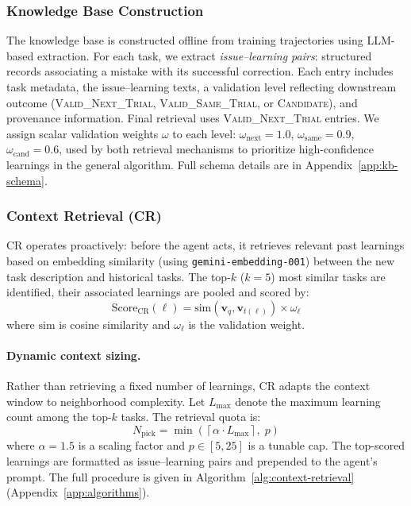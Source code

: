 \subsubsection{Knowledge Base Construction}
\label{sec:kb-construction}

The knowledge base is constructed offline from training trajectories using LLM-based extraction. For each task, we extract \emph{issue--learning pairs}: structured records associating a mistake with its successful correction. Each entry includes task metadata, the issue--learning texts, a validation level reflecting downstream outcome (\textsc{Valid\_Next\_Trial}, \textsc{Valid\_Same\_Trial}, or \textsc{Candidate}), and provenance information. Final retrieval uses \textsc{Valid\_Next\_Trial} entries. We assign scalar validation weights $\omega$ to each level: $\omega_{\text{next}} = 1.0$, $\omega_{\text{same}} = 0.9$, $\omega_{\text{cand}} = 0.6$, used by both retrieval mechanisms to prioritize high-confidence learnings in the general algorithm. Full schema details are in Appendix~\ref{app:kb-schema}.

\subsubsection{Context Retrieval (CR)}
\label{sec:context-retrieval}

CR operates proactively: before the agent acts, it retrieves relevant past learnings based on embedding similarity (using \texttt{gemini-embedding-001}) between the new task description and historical tasks. The top-$k$ ($k{=}5$) most similar tasks are identified, their associated learnings are pooled and scored by:
\begin{equation}
    \text{Score}_{\text{CR}}(\ell) = \text{sim}(\mathbf{v}_q, \mathbf{v}_{t(\ell)}) \times \omega_{\ell}
\label{eq:cr-score}
\end{equation}
where $\text{sim}$ is cosine similarity and $\omega_{\ell}$ is the validation weight.

\paragraph{Dynamic context sizing.}
Rather than retrieving a fixed number of learnings, CR adapts the context window to neighborhood complexity. Let $L_{\max}$ denote the maximum learning count among the top-$k$ tasks. The retrieval quota is:
\begin{equation}
    N_{\text{pick}} = \min\!\left(\left\lceil \alpha \cdot L_{\max} \right\rceil,\; p\right)
\end{equation}
where $\alpha = 1.5$ is a scaling factor and $p \in [5, 25]$ is a tunable cap. The top-scored learnings are formatted as issue--learning pairs and prepended to the agent's prompt. The full procedure is given in Algorithm~\ref{alg:context-retrieval} (Appendix~\ref{app:algorithms}).


